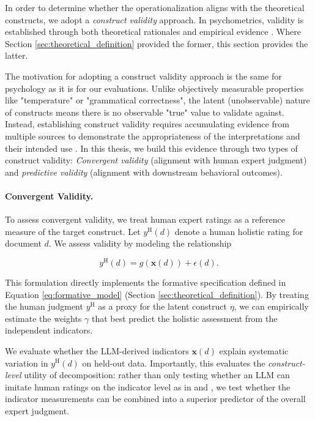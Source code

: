 In order to determine whether the operationalization aligns with the theoretical constructs, we adopt a \textit{construct validity} approach. In psychometrics, validity is established through both theoretical rationales and empirical evidence \citep{messick1989meaning}. Where Section \ref{sec:theoretical_definition} provided the former, this section provides the latter. %

The motivation for adopting a construct validity approach is the same for psychology as it is for our evaluations. Unlike objectively measurable properties like "temperature" or "grammatical correctness", the latent (unobservable) nature of constructs means there is no observable "true" value to validate against. Instead, establishing construct validity requires accumulating evidence from multiple sources to demonstrate the appropriateness of the interpretations and their intended use \citep{messick1989meaning}. In this thesis, we build this evidence through two types of construct validity: \textit{Convergent validity} (alignment with human expert judgment) and \textit{predictive validity} (alignment with downstream behavioral outcomes). 

\paragraph{Convergent Validity.} %
To assess convergent validity, we treat human expert ratings as a reference measure of the target construct. Let $y^{\text{H}}(d)$ denote a human holistic rating for document $d$. We assess validity by modeling the relationship

\begin{equation}\label{eq:convergent_validity_formative}
    y^{\text{H}}(d) = g(\mathbf{x}(d)) + \epsilon(d).
\end{equation}

This formulation directly implements the formative specification defined in Equation \ref{eq:formative_model} (Section \ref{sec:theoretical_definition}). By treating the human judgment $y^{\text{H}}$ as a proxy for the latent construct $\eta$, we can empirically estimate the weights $\gamma$ that best predict the holistic assessment from the independent indicators.

We evaluate whether the LLM-derived indicators $\mathbf{x}(d)$ explain systematic variation in $y^{\text{H}}(d)$ on held-out data. Importantly, this evaluates the \emph{construct-level} utility of decomposition: rather than only testing whether an LLM can imitate human ratings on the indicator level as in \citet{li-fine-grained-2026} and \citet{wang2025evaluating}, we test whether the indicator measurements can be combined into a superior predictor of the overall expert judgment.

